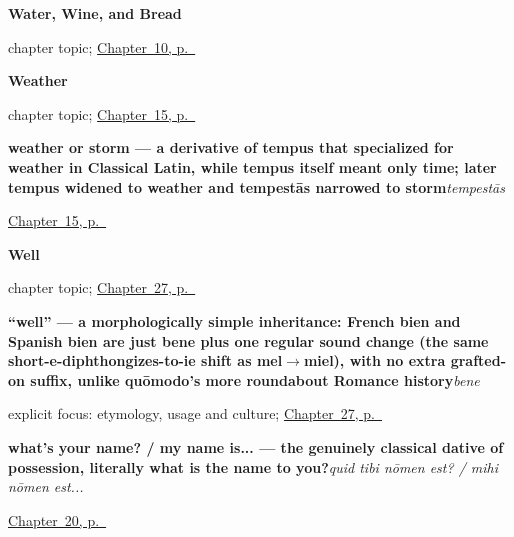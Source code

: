 \noindent\begin{minipage}[t]{\linewidth}
\raggedright
\textbf{Water, Wine, and Bread}\par
\footnotesize chapter topic; \hyperref[ch:la-water-wine-bread]{Chapter~10, p.~\pageref*{ch:la-water-wine-bread}}
\end{minipage}\par\smallskip

\noindent\begin{minipage}[t]{\linewidth}
\raggedright
\textbf{Weather}\par
\footnotesize chapter topic; \hyperref[ch:la-weather]{Chapter~15, p.~\pageref*{ch:la-weather}}
\end{minipage}\par\smallskip

\noindent\begin{minipage}[t]{\linewidth}
\raggedright
\textbf{weather or storm — a derivative of tempus that specialized for weather in Classical Latin, while tempus itself meant only time; later tempus widened to weather and tempestās narrowed to storm}\enspace\emph{tempestās}\par
\footnotesize \hyperref[ch:la-weather]{Chapter~15, p.~\pageref*{ch:la-weather}}
\end{minipage}\par\smallskip

\noindent\begin{minipage}[t]{\linewidth}
\raggedright
\textbf{Well}\par
\footnotesize chapter topic; \hyperref[ch:la-well]{Chapter~27, p.~\pageref*{ch:la-well}}
\end{minipage}\par\smallskip

\noindent\begin{minipage}[t]{\linewidth}
\raggedright
\textbf{\textquotedblleft{}well\textquotedblright{} — a morphologically simple inheritance: French bien and Spanish bien are just bene plus one regular sound change (the same short-e-diphthongizes-to-ie shift as mel$\to$miel), with no extra grafted-on suffix, unlike quōmodo's more roundabout Romance history}\enspace\emph{bene}\par
\footnotesize explicit focus: etymology, usage and culture; \hyperref[ch:la-well]{Chapter~27, p.~\pageref*{ch:la-well}}
\end{minipage}\par\smallskip

\noindent\begin{minipage}[t]{\linewidth}
\raggedright
\textbf{what's your name? / my name is... — the genuinely classical dative of possession, literally what is the name to you?}\enspace\emph{quid tibi nōmen est? / mihi nōmen est...}\par
\footnotesize \hyperref[ch:la-exchanging-names]{Chapter~20, p.~\pageref*{ch:la-exchanging-names}}
\end{minipage}\par\smallskip

